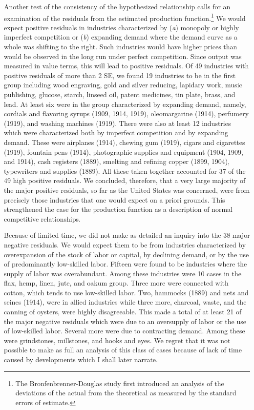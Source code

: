 \documentclass{article}
\begin{document}
Another test of the consistency of the hypothesized relationship calls for an examination of the residuals from the estimated production function.\footnote{The Bronfenbrenner-Douglas study first introduced an analysis of the deviations of the actual from the theoretical as measured by the standard errors of estimate.} We would expect positive residuals in industries characterized by (\emph{a}) monopoly or highly imperfect competition or (\emph{b}) expanding demand where the demand curve as a whole was shifting to the right. Such industries would have higher prices than would be observed in the long run under perfect competition. Since output was measured in value terms, this will lead to positive residuals. Of 49 industries with positive residuals of more than 2 SE, we found 19 industries to be in the first group including wood engraving, gold and silver reducing, lapidary work, music publishing, glucose, starch, linseed oil, patent medicines, tin plate, brass, and lead. At least six were in the group characterized by expanding demand, namely, cordials and flavoring syrups (1909, 1914, 1919), oleomargarine (1914), perfumery (1919), and washing machines (1919). There were also at least 12 industries which were characterized both by imperfect competition and by expanding demand. These were airplanes (1914), chewing gum (1919), cigars and cigarettes (1919), fountain pens (1914), photographic supplies and equipment (1904, 1909, and 1914), cash registers (1889), smelting and refining copper (1899, 1904), typewriters and supplies (1889). All these taken together accounted %
for 37 of the 49 high positive residuals. We concluded, therefore, that a very large majority of the major positive residuals, so far as the United States was concerned, were from precisely those industries that one would expect on a priori grounds. This strengthened the case for the production function as a description of normal competitive relationships.

Because of limited time, we did not make as detailed an inquiry into the 38 major negative residuals. We would expect them to be from industries characterized by overexpansion of the stock of labor or capital, by declining demand, or by the use of predominantly low-skilled labor. Fifteen were found to be industries where the supply of labor was overabundant. Among these industries were 10 cases in the flax, hemp, linen, jute, and oakum group. Three more were connected with cotton, which tends to use low-skilled labor. Two, hammocks (1889) and nets and seines (1914), were in allied industries while three more, charcoal, waste, and the canning of oysters, were highly disagreeable. This made a total of at least 21 of the major negative residuals which were due to an oversupply of labor or the use of low-skilled labor. Several more were due to contracting demand. Among these were grindstones, millstones, and hooks and eyes. We regret that it was not possible to make as full an analysis of this class of cases because of lack of time caused by developments which I shall later narrate.
\end{document}
